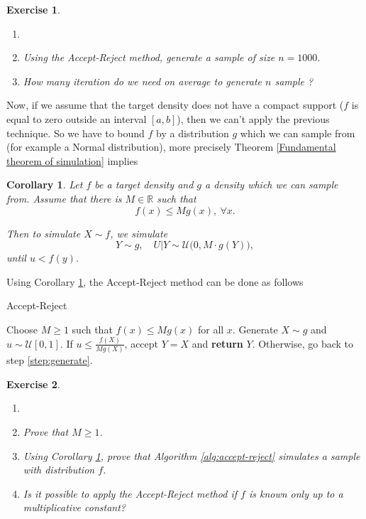 \documentclass{article}\usepackage[]{graphicx}\usepackage[]{xcolor}
\newtheorem{exercise}{Exercise}
\newtheorem{corollary}{Corollary}
\begin{document}
\begin{exercise}
\begin{enumerate}
\item[]
\item Using the \textit{Accept-Reject} method, generate a sample of size $n = 1000$.
\item How many iteration do we need on average to generate $n$ sample ?
\end{enumerate}
\end{exercise}

Now, if we assume that the target density does not have a compact support ($f$ is equal to zero outside an interval $[a,b]$), then we can't apply the previous technique. So we have to bound $f$ by a distribution $g$ which we can sample from (for example a Normal distribution), more precisely Theorem \ref{Fundamental theorem of simulation} implies 

\begin{corollary}\label{Accept-reject theo corr}
Let $f$ be a target density and $g$ a density which we can sample from. Assume that there is $M\in \mathbb{R}$ such that 
\begin{equation*}
f(x) \leq M g(x), ~\forall x.
\end{equation*}

Then to simulate $X \sim f$, we simulate 
\begin{equation*}
Y \sim g,\quad U|Y \sim \mathcal{U}\big(0,M\cdot g(Y)\big),
\end{equation*}
until $ u < f(y)$.
\end{corollary}

Using Corollary \ref{Accept-reject theo corr}, the Accept-Reject method can be done as follows

\begin{algorithm}[H]
\caption{Accept-Reject}
\label{alg:accept-reject}
\begin{algorithmic}[1]
\State Choose \( M \geq 1 \) such that \( f(x) \leq M g(x) \) for all \( x \).
\State \label{step:generate} Generate \( X \sim g \) and \( u \sim \mathcal{U}[0,1] \).
\State If \( u \leq \frac{f(X)}{M g(X)} \), accept \( Y = X \) and \textbf{return} \( Y \).
\State Otherwise, go back to step \ref{step:generate}.
\end{algorithmic}
\end{algorithm}

\begin{exercise}
\begin{enumerate}
\item[] 
\item Prove that $M\geq 1$.
\item Using Corollary \ref{Accept-reject theo corr}, prove that Algorithm \ref{alg:accept-reject} simulates a sample with distribution $f$.
\item Is it possible to apply the Accept-Reject method if $f$ is known only up to a multiplicative constant?
\end{enumerate}
\end{exercise}
\end{document}
